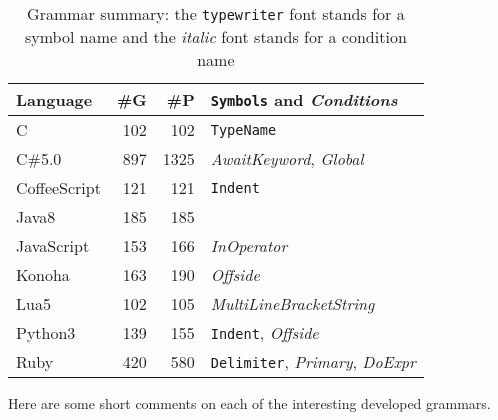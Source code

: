 \documentclass[preprint]{sigplanconf}
\begin{document}
\begin{table}[tb]
\begin{tabular}{lrrl}
Language & \#G  & \#P & {\tt Symbols} and {\it Conditions} \\ \hline
C & 102 & 102 &   {\tt TypeName} \\
C\#5.0 & 897 & 1325 &  {\it AwaitKeyword}, {\it Global} \\
CoffeeScript & 121 & 121 &  {\tt Indent} \\
Java8 & 185 & 185 & \\
JavaScript & 153 & 166 & {\it InOperator} \\
Konoha & 163  & 190 & {\it Offside} \\
Lua5 & 102 & 105 & {\it MultiLineBracketString} \\
Python3 & 139 & 155 & {\tt Indent}, {\it Offside} \\
Ruby & 420 & 580 & {\small {\tt Delimiter}, {\it Primary}, {\it DoExpr}} \\
\hline

\end{tabular}
\caption{Grammar summary: the {\tt typewriter} font stands for a symbol name and the {\it italic} font stands for a condition name}
\label{table:grammars}
\end{table}

Here are some short comments on each of the interesting developed grammars. 
\end{document}
